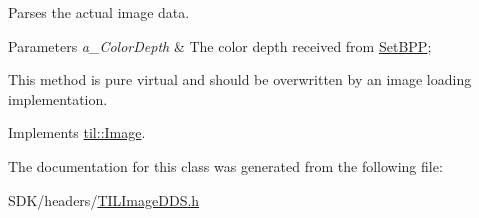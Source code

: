 Parses the actual image data. 


\begin{DoxyParams}{Parameters}
{\em a\_\-ColorDepth} & The color depth received from \hyperlink{classtil_1_1_image_ae1202f84c0addb81eba161f746a9d4cc}{SetBPP};\\
\hline
\end{DoxyParams}
This method is pure virtual and should be overwritten by an image loading implementation. 

Implements \hyperlink{classtil_1_1_image_a2436c982f6b403ab07591f06107fe432}{til::Image}.



The documentation for this class was generated from the following file:\begin{DoxyCompactItemize}
\item 
SDK/headers/\hyperlink{_t_i_l_image_d_d_s_8h}{TILImageDDS.h}\end{DoxyCompactItemize}
